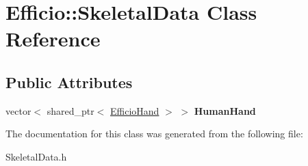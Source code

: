 \hypertarget{class_efficio_1_1_skeletal_data}{}\section{Efficio\+:\+:Skeletal\+Data Class Reference}
\label{class_efficio_1_1_skeletal_data}
\subsection*{Public Attributes}
\begin{DoxyCompactItemize}
\item 
vector$<$ shared\+\_\+ptr$<$ \hyperlink{class_efficio_1_1_efficio_hand}{Efficio\+Hand} $>$ $>$ {\bfseries Human\+Hand}\hypertarget{class_efficio_1_1_skeletal_data_a851f7102d47a74a365895197f8dd55ad}{}\label{class_efficio_1_1_skeletal_data_a851f7102d47a74a365895197f8dd55ad}

\end{DoxyCompactItemize}


The documentation for this class was generated from the following file\+:\begin{DoxyCompactItemize}
\item 
Skeletal\+Data.\+h\end{DoxyCompactItemize}
